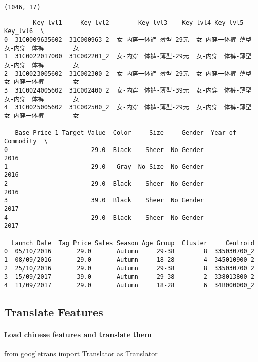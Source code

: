 \documentclass[11pt]{article}
\begin{document}
    \begin{Verbatim}[commandchars=\\\{\}]
(1046, 17)

    \end{Verbatim}

    
    \begin{verbatim}
        Key_lvl1     Key_lvl2        Key_lvl3    Key_lvl4 Key_lvl5 Key_lvl6  \
0  31C0009635602  31C000963_2  女-内穿一体裤-薄型-29元  女-内穿一体裤-薄型  女-内穿一体裤        女   
1  31C0022017000  31C002201_2  女-内穿一体裤-薄型-29元  女-内穿一体裤-薄型  女-内穿一体裤        女   
2  31C0023005602  31C002300_2  女-内穿一体裤-薄型-29元  女-内穿一体裤-薄型  女-内穿一体裤        女   
3  31C0024005602  31C002400_2  女-内穿一体裤-薄型-39元  女-内穿一体裤-薄型  女-内穿一体裤        女   
4  31C0025005602  31C002500_2  女-内穿一体裤-薄型-29元  女-内穿一体裤-薄型  女-内穿一体裤        女   

   Base Price 1 Target Value  Color     Size     Gender  Year of Commodity  \
0                       29.0  Black    Sheer  No Gender               2016   
1                       29.0   Gray  No Size  No Gender               2016   
2                       29.0  Black    Sheer  No Gender               2016   
3                       39.0  Black    Sheer  No Gender               2017   
4                       29.0  Black    Sheer  No Gender               2017   

  Launch Date  Tag Price Sales Season Age Group  Cluster     Centroid  
0  05/10/2016       29.0       Autumn     29-38        8  335030700_2  
1  08/09/2016       29.0       Autumn     18-28        4  345010900_2  
2  25/10/2016       29.0       Autumn     29-38        8  335030700_2  
3  15/09/2017       39.0       Autumn     29-38        2  338013800_2  
4  11/09/2017       29.0       Autumn     18-28        6  34B000000_2  
    \end{verbatim}

    
    \subsection{Translate Features}\label{translate-features}

    \paragraph{Load chinese features and translate
them}\label{load-chinese-features-and-translate-them}
from googletrans import Translator as Translator
\end{document}
